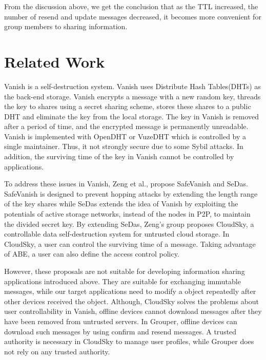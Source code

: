\documentclass[twocolumn,10pt]{article}
\begin{document}
From the discussion above, we get the conclusion that as the TTL increased, the number of resend and update messages decreased, it becomes more convenient for group members to sharing information.

\section{Related Work}

Vanish is a self-destruction system\cite{geambasu2009vanish}. 
Vanish uses Distribute Hash Tables(DHTs) as the back-end storage.
Vanish encrypts a message with a new random key, threads the key to shares using a secret sharing scheme, stores these shares to a public DHT and eliminate the key from the local storage.
The key in Vanish is removed after a period of time, and the encrypted message is permanently unreadable.
Vanish is implemented with OpenDHT\cite{rhea2005opendht} or VuzeDHT\cite{vuzedht} which is controlled by a single maintainer. 
Thus, it not strongly secure due to some Sybil attacks\cite{wolchok2010defeating}. 
In addition, the surviving time of the key in Vanish cannot be controlled by applications. 

To address these issues in Vanish, Zeng et al., propose SafeVanish\cite{zeng2010safevanish} and SeDas\cite{zeng2012sedas}. 
SafeVanish is designed to prevent hopping attacks by extending the length range of the key shares while SeDas extends the idea of Vanish by exploiting the potentials of active storage networks, instead of the nodes in P2P, to maintain the divided secret key. By extending SeDas, Zeng's group proposes CloudSky\cite{zeng2015cloudsky}, a controllable data self-destruction system for untrusted cloud storage. 
In CloudSky, a user can control the surviving time of a message.
Taking advantage of ABE, a user can also define the access control policy.

However, these proposals are not suitable for developing information sharing applications introduced above. 
They are suitable for exchanging immutable messages, while our target applications need to modify a object repeatedly after other devices received the object. 
Although, CloudSky solves the problems about user controllability in Vanish, offline devices cannot download messages after they have been removed from untrusted servers.
In Grouper, offline devices can download such messages by using confirm and resend messages.
A trusted authority is necessary in CloudSky to manage user profiles, while Grouper does not rely on any trusted authority.
\end{document}
